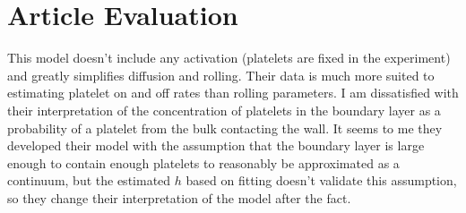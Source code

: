 \documentclass[
10pt, %
letterpaper, %
twocolumn, %
landscape %
]{article}
\begin{document}

\section*{Article Evaluation}

This model doesn't include any activation (platelets are fixed in the
experiment) and greatly simplifies diffusion and rolling. Their data
is much more suited to estimating platelet on and off rates than
rolling parameters. I am dissatisfied with their interpretation of the
concentration of platelets in the boundary layer as a probability of a
platelet from the bulk contacting the wall. It seems to me they
developed their model with the assumption that the boundary layer is
large enough to contain enough platelets to reasonably be approximated
as a continuum, but the estimated $h$ based on fitting doesn't
validate this assumption, so they change their interpretation of the
model after the fact.


\renewcommand{\refname}{Reference} %


\end{document}

